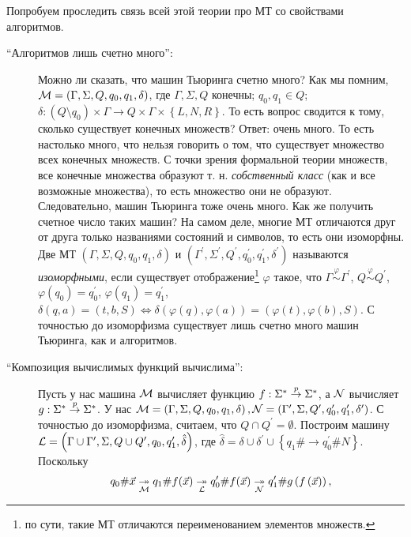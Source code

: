 Попробуем проследить связь всей этой теории про МТ со свойствами алгоритмов.
\begin{description}
    \item[\enquote{Алгоритмов лишь счетно много}:] Можно ли сказать, что машин Тьюринга счетно много?
    Как мы помним, $\mathcal{M} = \left(\Gamma, \Sigma, Q, q_{0}, q_{1}, \delta\right)$, где $\Gamma, \Sigma, Q$ конечны; $q_{0}, q_{1} \in Q$; $\delta: \left(Q \setminus q_{0}\right)  \times \Gamma \to Q \times \Gamma \times \left\{L, N, R\right\}$.
    То есть вопрос сводится к тому, сколько существует конечных множеств?
    Ответ: очень много.
    То есть настолько много, что нельзя говорить о том, что существует множество всех конечных множеств.
    С точки зрения формальной теории множеств, все конечные множества образуют т. н. {\it собственный класс} (как и все возможные множества), то есть множество они не образуют.
    Следовательно, машин Тьюринга тоже очень много.
    Как же получить счетное число таких машин?
    На самом деле, многие МТ отличаются друг от  друга только названиями состояний и символов, то есть они изоморфны.
    Две МТ $\left(\Gamma, \Sigma, Q, q_{0}, q_{1}, \delta\right)$ и $\left(\Gamma^{\prime}, \Sigma^{\prime}, Q^{\prime}, q_{0}^{\prime}, q_{1}^{\prime}, \delta^{\prime}\right)$ называются {\it изоморфными}, если существует отображение\footnote{по сути, такие МТ отличаются переименованием элементов множеств.} $\varphi$ такое, что $\Gamma \overset{\varphi}{\sim} \Gamma^{\prime}$, $Q \overset{\varphi}{\sim} Q^{\prime}$, $\varphi\left(q_{0}\right) = q_{0}^{\prime}$, $\varphi\left(q_{1}\right) = q_{1}^{\prime}$, $\delta(q, a) = (t, b,  S) \iff \delta(\varphi(q), \varphi(a)) = (\varphi(t), \varphi(b), S)$.
    С точностью до изоморфизма существует лишь счетно много машин Тьюринга, как и алгоритмов.
    \item[\enquote{Композиция вычислимых функций вычислима}:] Пусть у нас машина $\mathcal{M}$ вычисляет функцию $f: \Sigma^{*} \overset{p}{\to} \Sigma^{*}$, а $\mathcal{N}$ вычисляет $g: \Sigma^{*} \overset{p}{\to} \Sigma^{*}$.
    У нас $\mathcal{M} = \left(\Gamma, \Sigma, Q, q_{0}, q_{1}, \delta\right), \mathcal{N} = \left(\Gamma^{\prime}, \Sigma, Q^{\prime}, q_{0}^{\prime}, q_{1}^{\prime}, \delta^{\prime}\right)$.
    С точностью до изоморфизма, считаем, что $Q \cap Q^{\prime} = \emptyset$.
    Построим машину $\mathcal{L} = \left(\Gamma \cup \Gamma^{\prime}, \Sigma, Q \cup Q^{\prime}, q_{0}, q_{1}^{\prime}, \hat{\delta}\right)$, где $\hat{\delta} = \delta \cup \delta^{\prime} \cup \left\{q_{1} \# \to q_{0}^{\prime} \# N\right\}$.
    Поскольку
    $$
        q_{0}\#\vec{x} \underset{\mathcal{M}}{\twoheadrightarrow} q_{1}\# f(\vec{x}) \underset{\mathcal{L}}{\twoheadrightarrow}  q_{0}^{\prime} \# f(\vec{x}) \underset{\mathcal{N}}{\twoheadrightarrow} q_{1}^{\prime} \# g\left(f\left(\vec{x}\right)\right),
$$
\end{description}
